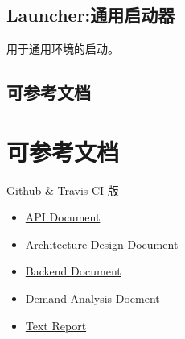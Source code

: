   \section{Launcher:通用启动器}
  用于通用环境的启动。
  
  
\newpage
    \begin{appendices}
        \def\ApiDocPDF{\href{https://github.com/XDUDsTeam/YrarbilRelease/raw/master/APIDoc.pdf}{API Document}}
        \def\ArchitectureDesignPDF{\href{https://github.com/XDUDsTeam/YrarbilRelease/raw/master/ArchitectureDesign.pdf}{Architecture Design Document}}
        \def\BackEndPdf{\href{https://github.com/XDUDsTeam/YrarbilRelease/raw/master/BackEnd.pdf}{Backend Document}} 
        \def\DemandAnalysisPdf{\href{https://github.com/XDUDsTeam/YrarbilRelease/raw/master/DemandAnalysis.pdf}{Demand Analysis Docment}}
        \def\TestReportPDF{\href{https://github.com/XDUDsTeam/YrarbilRelease/raw/master/TestReport.pdf}{Text Report}}
        
        \makeatletter
        \ifdefined \@NoStyleChapter
        \section{可参考文档}
        \else
        \chapter{可参考文档}
        \fi
        \makeatother
        
        
        Github \& Travis-CI 版
        \begin{itemize}
            \makeatletter
            \ifdefined \@APIDoc
            \relax
            \else
            \item \ApiDocPDF
            \fi
            
            \ifdefined \@ADDoc
            \relax
            \else
            \item \ArchitectureDesignPDF
            \fi
            
            \ifdefined \@BackendDoc
            \relax
            \else
            \item \BackEndPdf
            \fi
            
            \ifdefined \@DADoc
            \relax
            \else
            \item \DemandAnalysisPdf
            \fi
            
            \ifdefined \@TRDoc
            \relax
            \else
            \item \TestReportPDF
            \fi
            \makeatother
        \end{itemize}
    \end{appendices}

